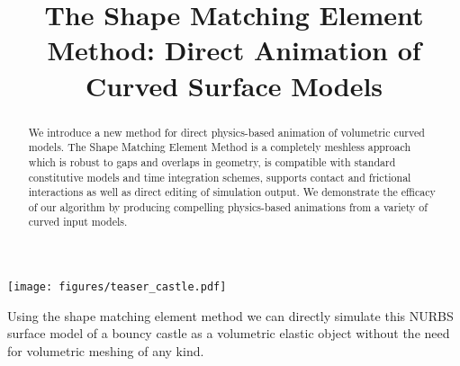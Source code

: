 \documentclass[acmtog, anonymous,review, nonacm, balance = false]{acmart}
\begin{document}
\title{The Shape Matching Element Method: Direct Animation of Curved Surface Models}

\begin{teaserfigure}
  \texttt{[image: figures/teaser\_castle.pdf]}
  \caption{Using the shape matching element method we can directly simulate this NURBS surface model of a bouncy castle as a volumetric elastic object without the need for volumetric meshing of any kind.}
  \label{fig:teaser}
\end{teaserfigure}

\begin{abstract}
We introduce a new method for direct physics-based animation of volumetric curved models.  
The Shape Matching Element Method is a completely meshless approach which is robust to gaps and overlaps in geometry, 
is compatible with standard constitutive models and time  integration schemes, supports contact and frictional interactions 
as well as direct editing of simulation output. 
We demonstrate the efficacy of our algorithm by producing compelling physics-based animations from a variety of curved input models.
\end{abstract}

\maketitle










\end{document}
